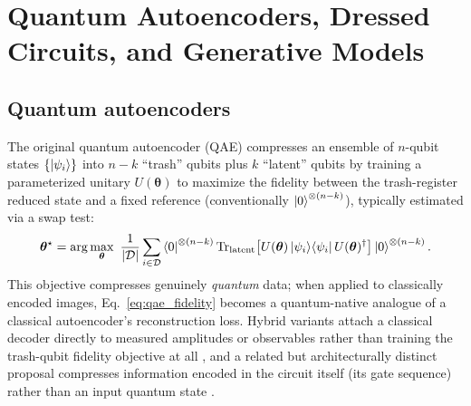\documentclass[11pt]{article}
\begin{document}
\section{Quantum Autoencoders, Dressed Circuits, and Generative Models}
\label{sec:qae}

\subsection{Quantum autoencoders}
The original quantum autoencoder (QAE) \cite{Romero2017} compresses an ensemble of $n$-qubit states $\{\ket{\psi_i}\}$ into $n-k$ ``trash'' qubits plus $k$ ``latent'' qubits by training a parameterized unitary $U(\bm{\theta})$ to maximize the fidelity between the trash-register reduced state and a fixed reference (conventionally $\ket{0}^{\otimes(n-k)}$), typically estimated via a swap test:
\begin{equation}
\bm{\theta}^\star = \arg\max_{\bm{\theta}}\ \frac{1}{|\mathcal{D}|}\sum_{i\in\mathcal{D}} \bra{0}^{\otimes(n-k)}\Tr_{\text{latent}}\!\left[U(\bm{\theta})\ket{\psi_i}\!\bra{\psi_i}U(\bm{\theta})^\dagger\right]\ket{0}^{\otimes(n-k)}.
\label{eq:qae_fidelity}
\end{equation}
This objective compresses genuinely \emph{quantum} data; when applied to classically encoded images, Eq.~\eqref{eq:qae_fidelity} becomes a quantum-native analogue of a classical autoencoder's reconstruction loss. Hybrid variants attach a classical decoder directly to measured amplitudes or observables rather than training the trash-qubit fidelity objective at all \cite{WangQAECompression2024,QAEClassification2025}, and a related but architecturally distinct proposal compresses information encoded in the circuit itself (its gate sequence) rather than an input quantum state \cite{QCAE2023}.
\end{document}
